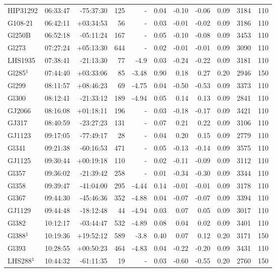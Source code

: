 \documentclass{aa}
\begin{document}
{\begin{longtable}{l r r r r r r r r r r}
HIP31292 & 06:33:47 & -75:37:30 & 125 &    - & 0.04 & -0.10 & -0.06 & 0.09 & 3184 &  110 \\
G108-21 & 06:42:11 & +03:34:53 & 56 &    - & 0.03 & -0.01 & -0.02 & 0.09 & 3186 &  110 \\
Gl250B & 06:52:18 & -05:11:24 & 167 &    - & 0.05 & -0.10 & -0.08 & 0.09 & 3453 &  110 \\
Gl273 & 07:27:24 & +05:13:30 & 644 &    - & 0.02 & -0.01 & -0.01 & 0.09 & 3090 &  110 \\
LHS1935 & 07:38:41 & -21:13:30 & 77 & -4.9 & 0.03 & -0.24 & -0.22 & 0.09 & 3181 &  110 \\
Gl285$^1$ & 07:44:40 & +03:33:06 & 85 & -3.48 & 0.90 & 0.18 & 0.27 & 0.20 & 2946 &  150 \\
Gl299 & 08:11:57 & +08:46:23 & 69 & -4.75 & 0.04 & -0.50 & -0.53 & 0.09 & 3373 &  110 \\
Gl300 & 08:12:41 & -21:33:12 & 189 & -4.94 & 0.05 & 0.14 & 0.13 & 0.09 & 2841 &  110 \\
GJ2066 & 08:16:08 & +01:18:11 & 196 &    - & 0.03 & -0.18 & -0.17 & 0.09 & 3421 &  110 \\
GJ317 & 08:40:59 & -23:27:23 & 131 &    - & 0.07 & 0.21 & 0.22 & 0.09 & 3106 &  110 \\
GJ1123 & 09:17:05 & -77:49:17 & 28 &    - & 0.04 & 0.20 & 0.15 & 0.09 & 2779 &  110 \\
Gl341 & 09:21:38 & -60:16:53 & 471 &    - & 0.05 & -0.13 & -0.14 & 0.09 & 3575 &  110 \\
GJ1125 & 09:30:44 & +00:19:18 & 110 &    - & 0.02 & -0.11 & -0.09 & 0.09 & 3112 &  110 \\
Gl357 & 09:36:02 & -21:39:42 & 258 &    - & 0.01 & -0.34 & -0.30 & 0.09 & 3344 &  110 \\
Gl358 & 09:39:47 & -41:04:00 & 295 & -4.44 & 0.14 & -0.01 & -0.01 & 0.09 & 3178 &  110 \\
Gl367 & 09:44:30 & -45:46:36 & 352 & -4.88 & 0.04 & -0.07 & -0.07 & 0.09 & 3394 &  110 \\
GJ1129 & 09:44:48 & -18:12:48 & 44 & -4.94 & 0.03 & 0.07 & 0.05 & 0.09 & 3017 &  110 \\
Gl382 & 10:12:17 & -03:44:47 & 532 & -4.89 & 0.08 & 0.04 & 0.02 & 0.09 & 3401 &  110 \\
Gl388$^1$ & 10:19:36 & +19:52:12 & 589 & -3.8 & 0.40 & 0.07 & 0.12 & 0.20 & 3171 &  150 \\
Gl393 & 10:28:55 & +00:50:23 & 464 & -4.83 & 0.04 & -0.22 & -0.20 & 0.09 & 3431 &  110 \\
LHS288$^1$ & 10:44:32 & -61:11:35 & 19 &    - & 0.03 & -0.60 & -0.55 & 0.20 & 2760 &  150 \\

\end{longtable}}
\end{document}
